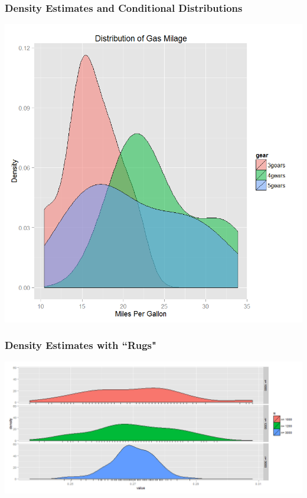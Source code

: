 \documentclass{beamer} %
\begin{document}
\begin{frame}\frametitle{Density Estimates and Conditional Distributions}

	\includegraphics[width=0.71\linewidth]{density.png}
\end{frame}





\begin{frame}\frametitle{Density Estimates with ``Rugs"}
	\centering
	\includegraphics[width=\linewidth]{rug.png}
\end{frame}
\end{document}

